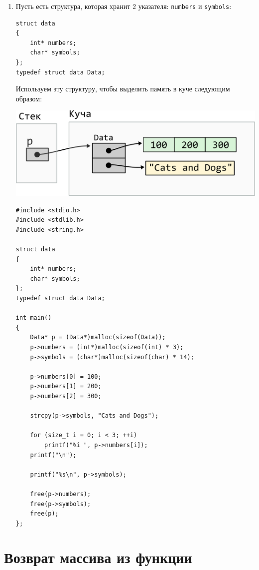\documentclass{article}
\begin{document}
\begin{enumerate}
\item Пусть есть структура, которая хранит 2 указателя: \texttt{numbers} и \texttt{symbols}:
\begin{lstlisting}
struct data 
{
    int* numbers;
    char* symbols;
};
typedef struct data Data;
\end{lstlisting}

Используем эту структуру, чтобы выделить память в куче следующим образом:
\begin{center}
\includegraphics[scale=0.83]{../images/malloc_class_tasks/heap_struct_with_pointers.png}
\end{center}
\begin{lstlisting}[style=heapExamplesStyle]
#include <stdio.h>
#include <stdlib.h>
#include <string.h>

struct data
{
    int* numbers;
    char* symbols;
};
typedef struct data Data;

int main()
{
    Data* p = (Data*)malloc(sizeof(Data));
    p->numbers = (int*)malloc(sizeof(int) * 3);
    p->symbols = (char*)malloc(sizeof(char) * 14);

    p->numbers[0] = 100;
    p->numbers[1] = 200;
    p->numbers[2] = 300;

    strcpy(p->symbols, "Cats and Dogs");

    for (size_t i = 0; i < 3; ++i)
        printf("%i ", p->numbers[i]);
    printf("\n");

    printf("%s\n", p->symbols);

    free(p->numbers);
    free(p->symbols);
    free(p);
};
\end{lstlisting}

\end{enumerate}



\newpage
\section*{Возврат массива из функции}
\end{document}
